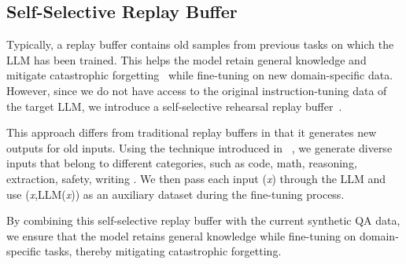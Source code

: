 \subsection{Self-Selective Replay Buffer}
\label{subsec:self_selective_replay}
Typically, a replay buffer contains old samples from previous tasks on which the LLM has been trained. This helps the model retain general knowledge and mitigate catastrophic forgetting~\citep{zhang2024dissecting, ke2023continual, jang2021towards} while fine-tuning on new domain-specific data. However, since we do not have access to the original instruction-tuning data of the target LLM, 
we introduce a self-selective rehearsal replay buffer~\citep{gupta2024selective, huang2024mitigating}.

This approach differs from traditional replay buffers in that it generates new outputs for old inputs. 
Using the technique introduced in ~\citep{sudalairaj2024lab}, we generate diverse inputs that belong to different categories, such as code, math, reasoning, extraction, safety, writing \etc.  
We then pass each input (\textit{x}) through the LLM and use (\textit{x},LLM(\textit{x})) as an auxiliary dataset during the fine-tuning process.

By combining this self-selective replay buffer with the current synthetic QA data, we ensure that the model retains general knowledge while fine-tuning on domain-specific tasks, thereby mitigating catastrophic forgetting. 